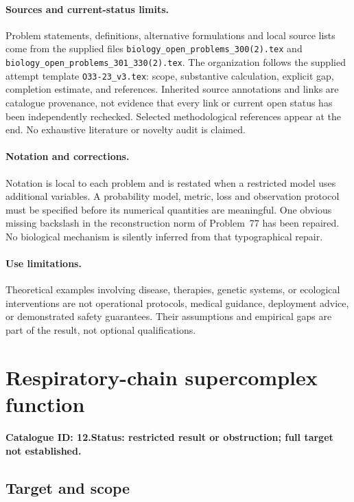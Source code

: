 \documentclass[11pt]{article}
\begin{document}
\paragraph{Sources and current-status limits.}
Problem statements, definitions, alternative formulations and local source lists
come from the supplied files
\texttt{biology\_open\_problems\_300(2).tex} and
\texttt{biology\_open\_problems\_301\_330(2).tex}.
The organization follows the supplied attempt template
\texttt{O33-23\_v3.tex}: scope, substantive calculation, explicit gap,
completion estimate, and references. Inherited source annotations and links are
catalogue provenance, not evidence that every link or current open status has
been independently rechecked. Selected methodological references appear at the
end. No exhaustive literature or novelty audit is claimed.

\paragraph{Notation and corrections.}
Notation is local to each problem and is restated when a restricted model uses
additional variables. A probability model, metric, loss and observation protocol
must be specified before its numerical quantities are meaningful. One obvious
missing backslash in the reconstruction norm of Problem~77 has been repaired.
No biological mechanism is silently inferred from that typographical repair.

\paragraph{Use limitations.}
Theoretical examples involving disease, therapies, genetic systems, or ecological
interventions are not operational protocols, medical guidance, deployment advice,
or demonstrated safety guarantees. Their assumptions and empirical gaps are part
of the result, not optional qualifications.

\setcounter{section}{11}
\section{Respiratory-chain supercomplex function}
\label{prob:012}
\noindent\textbf{Catalogue ID: 12.}\quad \textbf{Status: restricted result or obstruction; full target not established.}
\subsection{Target and scope}
\end{document}
